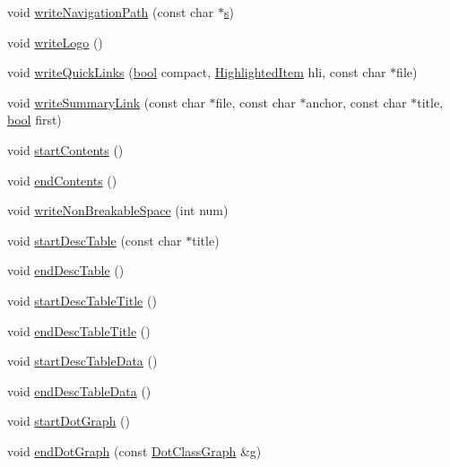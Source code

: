 \begin{DoxyCompactItemize}
\item 
void \hyperlink{class_output_list_a18eb7bb7378c700327a1a4a9c2606ec5}{write\+Navigation\+Path} (const char $\ast$\hyperlink{060__command__switch_8tcl_a011c73f2dbb87635a3b4206c72355f6e}{s})
\item 
void \hyperlink{class_output_list_a739eb036549fb3787e5daa3d35bc1aff}{write\+Logo} ()
\item 
void \hyperlink{class_output_list_a6e54b85927d53ba0168ef08a3bd748fd}{write\+Quick\+Links} (\hyperlink{qglobal_8h_a1062901a7428fdd9c7f180f5e01ea056}{bool} compact, \hyperlink{index_8h_a6643b7765422a7eb577f0b2ed8fb2e09}{Highlighted\+Item} hli, const char $\ast$file)
\item 
void \hyperlink{class_output_list_a53d9546827d8cd1137b6ff3ec7db1984}{write\+Summary\+Link} (const char $\ast$file, const char $\ast$anchor, const char $\ast$title, \hyperlink{qglobal_8h_a1062901a7428fdd9c7f180f5e01ea056}{bool} first)
\item 
void \hyperlink{class_output_list_ac891ad4a7081e1ab9d42a637596111db}{start\+Contents} ()
\item 
void \hyperlink{class_output_list_a317bae5a753eac709cf776b2ec2fb732}{end\+Contents} ()
\item 
void \hyperlink{class_output_list_ae6cc078977edd1e2a5ae2cf6ed64ed35}{write\+Non\+Breakable\+Space} (int num)
\item 
void \hyperlink{class_output_list_afbb3ffe228e3d50508ee7161194344fc}{start\+Desc\+Table} (const char $\ast$title)
\item 
void \hyperlink{class_output_list_a223fb4453aeeaf8270e8bd5f875ed9c9}{end\+Desc\+Table} ()
\item 
void \hyperlink{class_output_list_a6b984edbfa21eecfe20b2a7a3ef0fc97}{start\+Desc\+Table\+Title} ()
\item 
void \hyperlink{class_output_list_a51b3d439827ec272ecc6e8c2e108eac0}{end\+Desc\+Table\+Title} ()
\item 
void \hyperlink{class_output_list_a8823d3ed58554ae3eeb9169ff920ba00}{start\+Desc\+Table\+Data} ()
\item 
void \hyperlink{class_output_list_a66b7fd1338764cbe47b66d3f9e77bb07}{end\+Desc\+Table\+Data} ()
\item 
void \hyperlink{class_output_list_ac6fc93128d92c79a08995457b10f6e1f}{start\+Dot\+Graph} ()
\item 
void \hyperlink{class_output_list_a039bfcce8dbfff89288b249be62565a7}{end\+Dot\+Graph} (const \hyperlink{class_dot_class_graph}{Dot\+Class\+Graph} \&\hyperlink{060__command__switch_8tcl_af08b4b5bfa9edf0b0a7dee1c2b2c29e0}{g})

\end{DoxyCompactItemize}
